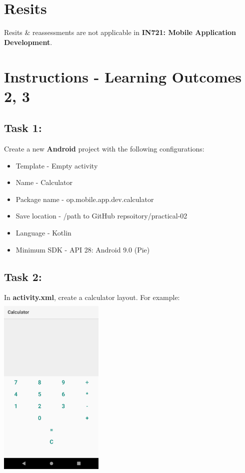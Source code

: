 \documentclass{article}
\begin{document}
\section*{Resits}
Resits \& reassessments are not applicable in \textbf{IN721: Mobile Application Development}.

\section*{Instructions - Learning Outcomes 2, 3}

\subsection*{Task 1:} Create a new \textbf{Android} project with the following configurations:
\begin{itemize}
	\item Template - Empty activity
	\item Name - Calculator
	\item Package name - op.mobile.app.dev.calculator
	\item Save location - /path to GitHub repsoitory/practical-02
	\item Language - Kotlin
	\item Minimum SDK - API 28: Android 9.0 (Pie) 
\end{itemize}

\subsection*{Task 2:} In \textbf{activity.xml}, create a calculator layout. For example: \\

\includegraphics[width=5cm, height=9cm]{../tex/img/02-android-overview/practical/calculator.png}  \\
\end{document}
